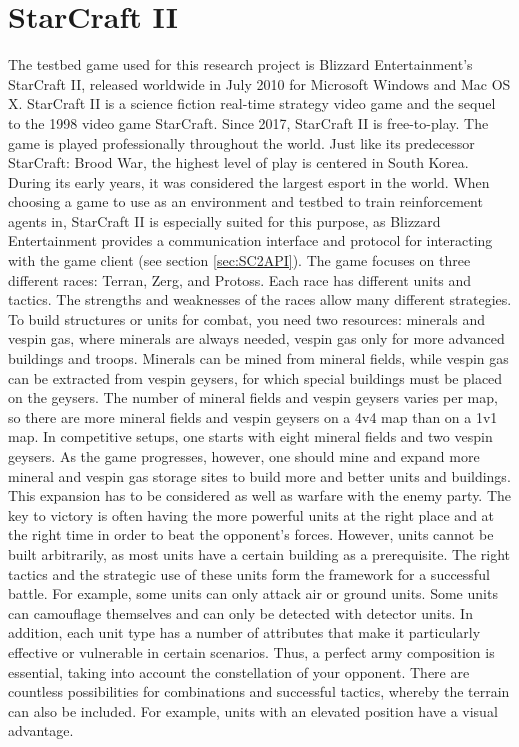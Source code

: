 \documentclass[12pt,a4paper]{article}
\begin{document}
\section{StarCraft II}\label{sec:SC2}
The testbed game used for this research project is Blizzard Entertainment's StarCraft II, released worldwide in July 2010 for Microsoft Windows and Mac OS X. StarCraft II is a science fiction real-time strategy video game and the sequel to the 1998 video game StarCraft. Since 2017, StarCraft II is free-to-play. The game is played professionally throughout the world. Just like its predecessor StarCraft: Brood War, the highest level of play is centered in South Korea. During its early years, it was considered the largest esport in the world.
When choosing a game to use as an environment and testbed to train reinforcement agents in, StarCraft II is especially suited for this purpose, as Blizzard Entertainment provides a communication interface and protocol for interacting with the game client (see section \ref{sec:SC2API}).
The game focuses on three different races: Terran, Zerg, and Protoss. Each race has different units and tactics. The strengths and weaknesses of the races allow many different strategies.
To build structures or units for combat, you need two resources: minerals and vespin gas, where minerals are always needed, vespin gas only for more advanced buildings and troops. Minerals can be mined from mineral fields, while vespin gas can be extracted from vespin geysers, for which special buildings must be placed on the geysers. The number of mineral fields and vespin geysers varies per map, so there are more mineral fields and vespin geysers on a 4v4 map than on a 1v1 map.
In competitive setups, one starts with eight mineral fields and two vespin geysers. As the game progresses, however, one should mine and expand more mineral and vespin gas storage sites to build more and better units and buildings. This expansion has to be considered as well as warfare with the enemy party.
The key to victory is often having the more powerful units at the right place and at the right time in order to beat the opponent's forces.
However, units cannot be built arbitrarily, as most units have a certain building as a prerequisite. The right tactics and the strategic use of these units form the framework for a successful battle. For example, some units can only attack air or ground units. Some units can camouflage themselves and can only be detected with detector units. In addition, each unit type has a number of attributes that make it particularly effective or vulnerable in certain scenarios. Thus, a perfect army composition is essential, taking into account the constellation of your opponent. There are countless possibilities for combinations and successful tactics, whereby the terrain can also be included. For example, units with an elevated position have a visual advantage.
\end{document}

